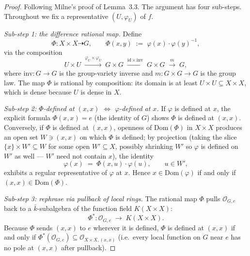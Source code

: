 \begin{proof}
  Following Milne's proof of Lemma~3.3. The argument has four sub-steps. Throughout we
  fix a representative \((U, \varphi_U)\) of \(f\).

  \emph{Sub-step 1: the difference rational map.} Define
  \[
    \Phi \colon X \times X \dashrightarrow G,
    \qquad
    \Phi(x, y) \;:=\; \varphi(x) \cdot \varphi(y)^{-1},
  \]
  via the composition
  \[
    U \times U
    \;\xrightarrow{\varphi_U \times \varphi_U}\; G \times G
    \;\xrightarrow{\mathrm{id} \times \mathrm{inv}}\; G \times G
    \;\xrightarrow{m}\; G,
  \]
  where \(\mathrm{inv} \colon G \to G\) is the group-variety inverse and
  \(m \colon G \times G \to G\) is the group law. The map \(\Phi\) is rational by
  composition: its domain is at least \(U \times U \subseteq X \times X\), which is dense
  because \(U\) is dense in \(X\).

  \emph{Sub-step 2: \(\Phi\)-defined at \((x, x)\) \(\Leftrightarrow\) \(\varphi\)-defined at
  \(x\).} If \(\varphi\) is defined at \(x\), the explicit formula \(\Phi(x, x) = e\) (the
  identity of \(G\)) shows \(\Phi\) is defined at \((x, x)\). Conversely, if \(\Phi\) is
  defined at \((x, x)\), openness of \(\mathrm{Dom}(\Phi)\) in \(X \times X\) produces an
  open set \(W \ni (x, x)\) on which \(\Phi\) is defined; by projection (taking the slice
  \(\{x\} \times W' \subseteq W\) for some open \(W' \subseteq X\), possibly shrinking
  \(W'\) so \(\varphi\) is defined on \(W'\) as well --- \(W'\) need not contain \(x\)), the
  identity
  \[
    \varphi(x) \;=\; \Phi(x, u) \cdot \varphi(u),
    \qquad u \in W',
  \]
  exhibits a regular representative of \(\varphi\) at \(x\). Hence \(x \in
  \mathrm{Dom}(\varphi)\) if and only if \((x, x) \in \mathrm{Dom}(\Phi)\).

  \emph{Sub-step 3: rephrase via pullback of local rings.} The rational map \(\Phi\)
  pulls \(\mathcal O_{G, e}\) back to a \(\bar k\)-subalgebra of the function field
  \(K(X \times X)\):
  \[
    \Phi^\ast \colon \mathcal O_{G, e} \;\longrightarrow\; K(X \times X).
  \]
  Because \(\Phi\) sends \((x, x)\) to \(e\) wherever it is defined, \(\Phi\) is defined at
  \((x, x)\) if and only if \(\Phi^\ast(\mathcal O_{G, e}) \subseteq \mathcal O_{X
  \times X, (x, x)}\) (i.e.\ every local function on \(G\) near \(e\) has no pole at
  \((x, x)\) after pullback).


\end{proof}
